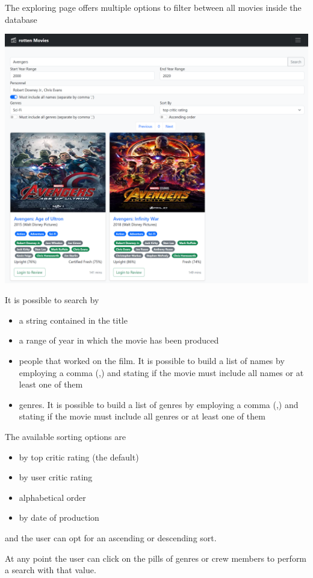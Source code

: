 The exploring page offers multiple options to filter between all movies inside the database

\includegraphics[scale=0.45]{../../../images/user_manual/search_query.png} 

It is possible to search by 
\begin{itemize}
\item a string contained in the title
\item a range of year in which the movie has been produced
\item people that worked on the film. It is possible to build a list of names by employing a comma (,) and stating if the movie must include all names or at least one of them
\item genres. It is possible to build a list of genres by employing a comma (,) and stating if the movie must include all genres or at least one of them
\end{itemize}

The available sorting options are
\begin{itemize}
\item by top critic rating (the default)
\item by user critic rating
\item alphabetical order
\item by date of production
\end{itemize}
and the user can opt for an ascending or descending sort.

At any point the user can click on the pills of genres or crew members to perform a search with that value.

